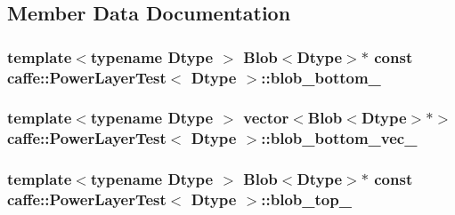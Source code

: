 \subsection{Member Data Documentation}
\hypertarget{classcaffe_1_1_power_layer_test_ad71db592caf5da0ccd64cae0e07c65dd}{
\subsubsection[{blob\+\_\+bottom\+\_\+}]{\setlength{\rightskip}{0pt plus 5cm}template$<$typename Dtype $>$ {\bf Blob}$<$Dtype$>$$\ast$ const {\bf caffe\+::\+Power\+Layer\+Test}$<$ Dtype $>$\+::blob\+\_\+bottom\+\_\+\hspace{0.3cm}{\ttfamily [protected]}}}\label{classcaffe_1_1_power_layer_test_ad71db592caf5da0ccd64cae0e07c65dd}
\hypertarget{classcaffe_1_1_power_layer_test_a67e290490b55539ed56cb259b854c1ee}{
\subsubsection[{blob\+\_\+bottom\+\_\+vec\+\_\+}]{\setlength{\rightskip}{0pt plus 5cm}template$<$typename Dtype $>$ vector$<${\bf Blob}$<$Dtype$>$$\ast$$>$ {\bf caffe\+::\+Power\+Layer\+Test}$<$ Dtype $>$\+::blob\+\_\+bottom\+\_\+vec\+\_\+\hspace{0.3cm}{\ttfamily [protected]}}}\label{classcaffe_1_1_power_layer_test_a67e290490b55539ed56cb259b854c1ee}
\hypertarget{classcaffe_1_1_power_layer_test_af8895fa8f2dfe4511855caa22a21d1b2}{
\subsubsection[{blob\+\_\+top\+\_\+}]{\setlength{\rightskip}{0pt plus 5cm}template$<$typename Dtype $>$ {\bf Blob}$<$Dtype$>$$\ast$ const {\bf caffe\+::\+Power\+Layer\+Test}$<$ Dtype $>$\+::blob\+\_\+top\+\_\+\hspace{0.3cm}{\ttfamily [protected]}}}\label{classcaffe_1_1_power_layer_test_af8895fa8f2dfe4511855caa22a21d1b2}
